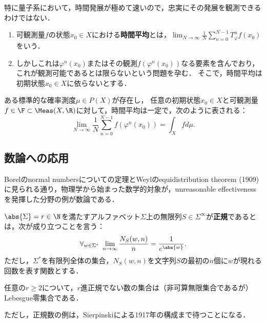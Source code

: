 \documentclass[uplatex,dvipdfmx]{jsreport}
\begin{document}
\begin{definition}
    特に量子系において，時間発展が極めて速いので，忠実にその発展を観測できるわけではない．
    \begin{enumerate}
        \item 可観測量$f$の状態$x_0\in X$における\textbf{時間平均}とは，$\lim_{N\to\infty}\frac{1}{N}\sum^{N-1}_{n=0}T^n_{\varphi}f(x_0)$をいう．
        \item しかしこれは$\varphi^n(x_0)$またはその観測$f(\varphi^n(x_0))$なる要素を含んでおり，これが観測可能であるとは限らないという問題を孕む．
        そこで，時間平均は初期状態$x_0\in X$に依らないとする．
    \end{enumerate}
\end{definition}

\begin{hypothesis}
    ある標準的な確率測度$\mu\in P(X)$が存在し，
    任意の初期状態$x_0\in X$と可観測量$f\in\F\subset\Meas(X,\R)$に対して，時間平均は一定で，次のように表される：
    \[\lim_{N\to\infty}\frac{1}{N}\sum^{N-1}_{n=0}f(\varphi^n(x_0))=\int_Xfd\mu.\]
\end{hypothesis}

\subsection{数論への応用}

\begin{tcolorbox}[colframe=ForestGreen, colback=ForestGreen!10!white,breakable,colbacktitle=ForestGreen!40!white,coltitle=black,fonttitle=\bfseries\sffamily,
title=]
    Borelのnormal numbersについての定理とWeylのequidistribution theorem (1909)に見られる通り，物理学から始まった数学的対象が，unreasonable effectivenessを発揮した分野の例が数論である．
\end{tcolorbox}

\begin{definition}
    $\abs{\Sigma}=r\in\N$を満たすアルファベット$\Sigma$上の無限列$S\in\Sigma^\infty$が\textbf{正規}であるとは，次が成り立つことを言う：
    \[\forall_{w\in\Sigma^*}\;\lim_{n\to\infty}\frac{N_S(w,n)}{n}=\frac{1}{e^{\abs{w}}}.\]
    ただし，$\Sigma^*$を有限列全体の集合，$N_S(w,n)$を文字列$S$の最初の$n$個に$w$が現れる回数を表す関数とする．
\end{definition}

\begin{theorem}[Borel]
    任意の$r\ge 2$について，$r$進正規でない数の集合は（非可算無限集合であるが）Lebesgue零集合である．
\end{theorem}
\begin{remark}
    ただし，正規数の例は，Sierpinskiによる1917年の構成まで待つことになる．
\end{remark}
\end{document}
